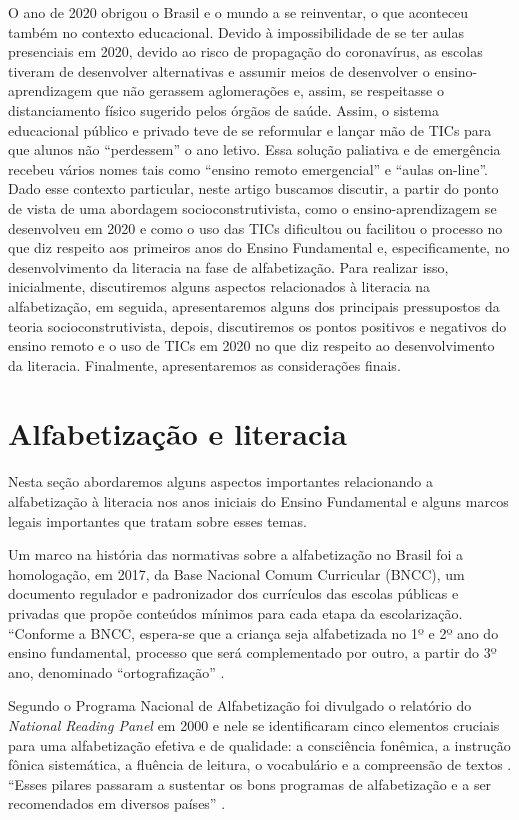 \documentclass{textolivre}
\begin{document}
O ano de 2020 obrigou o Brasil e o mundo a se reinventar, o que aconteceu também no contexto educacional. Devido à impossibilidade de se ter aulas presenciais em 2020, devido ao risco de propagação do coronavírus, as escolas tiveram de desenvolver alternativas e assumir meios de desenvolver o ensino-aprendizagem que não gerassem aglomerações e, assim, se respeitasse o distanciamento físico sugerido pelos órgãos de saúde. Assim, o sistema educacional público e privado teve de se reformular e lançar mão de TICs para que alunos não “perdessem” o ano letivo. Essa solução paliativa e de emergência recebeu vários nomes tais como “ensino remoto emergencial” e “aulas on-line”. Dado esse contexto particular, neste artigo buscamos discutir, a partir do ponto de vista de uma abordagem socioconstrutivista, como o ensino-aprendizagem se desenvolveu em 2020 e como o uso das TICs dificultou ou facilitou o processo no que diz respeito aos primeiros anos do Ensino Fundamental e, especificamente, no desenvolvimento da literacia na fase de alfabetização. Para realizar isso, inicialmente, discutiremos alguns aspectos relacionados à literacia na alfabetização, em seguida, apresentaremos alguns dos principais pressupostos da teoria socioconstrutivista, depois, discutiremos os pontos positivos e negativos do ensino remoto e o uso de TICs em 2020 no que diz respeito ao desenvolvimento da literacia. Finalmente, apresentaremos as considerações finais.

\section{Alfabetização e literacia}\label{alfab}
Nesta seção abordaremos alguns aspectos importantes relacionando a alfabetização à literacia nos anos iniciais do Ensino Fundamental e alguns marcos legais importantes que tratam sobre esses temas.

Um marco na história das normativas sobre a alfabetização no Brasil foi a homologação, em 2017, da Base Nacional Comum Curricular (BNCC), um documento regulador e padronizador dos currículos das escolas públicas e privadas que propõe conteúdos mínimos para cada etapa da escolarização. “Conforme a BNCC, espera-se que a criança seja alfabetizada no 1º e 2º ano do ensino fundamental, processo que será complementado por outro, a partir do 3º ano, denominado “ortografização” \cite[p. 14]{brasil2019}.

Segundo o Programa Nacional de Alfabetização \cite{brasil2019} foi divulgado o relatório do \emph{National Reading Panel} em 2000 e nele se identificaram cinco elementos cruciais para uma alfabetização efetiva e de qualidade: a consciência fonêmica, a instrução fônica sistemática, a fluência de leitura, o vocabulário e a compreensão de textos \cite{nationalreading2000}. “Esses pilares passaram a sustentar os bons programas de alfabetização e a ser recomendados em diversos países” \cite[p. 16]{brasil2019}.
\end{document}
